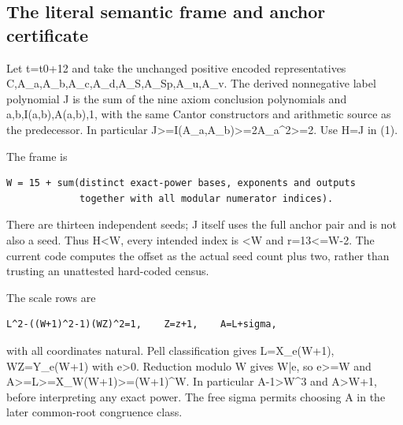\subsection{The literal semantic frame and anchor certificate}



Let t=\allowbreak{}t0+\allowbreak{}12 and take the unchanged positive encoded representatives C,A\_\allowbreak{}a,A\_\allowbreak{}b,A\_\allowbreak{}c,A\_\allowbreak{}d,A\_\allowbreak{}S,A\_\allowbreak{}Sp,A\_\allowbreak{}u,A\_\allowbreak{}v. The derived nonnegative label polynomial J is the sum of the nine axiom conclusion polynomials and a,b,I(a,b),A(a,b),1, with the same Cantor constructors and arithmetic source as the predecessor. In particular J\textgreater{}\allowbreak{}=\allowbreak{}I(A\_\allowbreak{}a,A\_\allowbreak{}b)\textgreater{}\allowbreak{}=\allowbreak{}2A\_\allowbreak{}a\textasciicircum{}\allowbreak{}2\textgreater{}\allowbreak{}=\allowbreak{}2. Use H=\allowbreak{}J in (1).



The frame is



\begin{verbatim}
W = 15 + sum(distinct exact-power bases, exponents and outputs
             together with all modular numerator indices).
\end{verbatim}

There are thirteen independent seeds; J itself uses the full anchor pair and is not also a seed. Thus H\textless{}\allowbreak{}W, every intended index is \textless{}\allowbreak{}W and r=\allowbreak{}13\textless{}\allowbreak{}=\allowbreak{}W-2. The current code computes the offset as the actual seed count plus two, rather than trusting an unattested hard-coded census.



The scale rows are



\begin{verbatim}
L^2-((W+1)^2-1)(WZ)^2=1,    Z=z+1,    A=L+sigma,
\end{verbatim}

with all coordinates natural. Pell classification gives L=\allowbreak{}X\_\allowbreak{}e(W+\allowbreak{}1), WZ=\allowbreak{}Y\_\allowbreak{}e(W+\allowbreak{}1) with e\textgreater{}\allowbreak{}0. Reduction modulo W gives W|e, so e\textgreater{}\allowbreak{}=\allowbreak{}W and A\textgreater{}\allowbreak{}=\allowbreak{}L\textgreater{}\allowbreak{}=\allowbreak{}X\_\allowbreak{}W(W+\allowbreak{}1)\textgreater{}\allowbreak{}=\allowbreak{}(W+\allowbreak{}1)\textasciicircum{}\allowbreak{}W. In particular A-1\textgreater{}\allowbreak{}W\textasciicircum{}\allowbreak{}3 and A\textgreater{}\allowbreak{}W+\allowbreak{}1, before interpreting any exact power. The free sigma permits choosing A in the later common-root congruence class.



